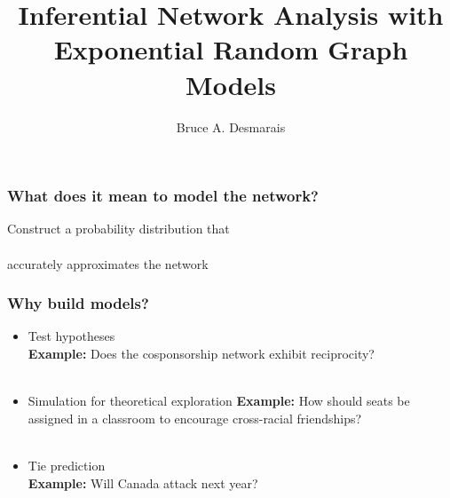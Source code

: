 \documentclass[handout]{beamer}
\title{Inferential Network Analysis with \\ Exponential Random Graph Models}
\author{Bruce A. Desmarais}
\begin{document}

\begin{frame}
  \titlepage
\end{frame}



\begin{frame}
\frametitle{What does it mean to model the network?}
\Large
Construct a probability distribution that \\~\\ accurately approximates the network
\end{frame}


\begin{frame}
\frametitle{Why build models?}

\begin{itemize}
\item {\Large Test hypotheses}\\
{\bf Example:} Does the cosponsorship network exhibit reciprocity? \\~\\
\item {\Large Simulation for theoretical exploration}
{\bf Example:} How should seats be assigned in a classroom to encourage cross-racial friendships? \\~\\
\item {\Large Tie prediction} \\
{\bf Example:} Will Canada attack next year?

\end{itemize}
\end{frame}
\end{document}
